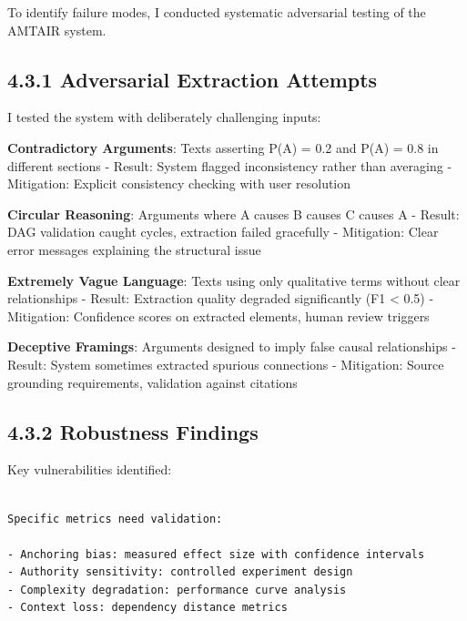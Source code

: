 \documentclass[
  11pt,
  letterpaper,
]{book}
\begin{document}

To identify failure modes, I conducted systematic adversarial testing of
the AMTAIR system.

\subsection*{4.3.1 Adversarial Extraction
Attempts}\label{sec-adversarial-extraction}

I tested the system with deliberately challenging inputs:

\textbf{Contradictory Arguments}: Texts asserting P(A) = 0.2 and P(A) =
0.8 in different sections - Result: System flagged inconsistency rather
than averaging - Mitigation: Explicit consistency checking with user
resolution

\textbf{Circular Reasoning}: Arguments where A causes B causes C causes
A - Result: DAG validation caught cycles, extraction failed gracefully -
Mitigation: Clear error messages explaining the structural issue

\textbf{Extremely Vague Language}: Texts using only qualitative terms
without clear relationships - Result: Extraction quality degraded
significantly (F1 \textless{} 0.5) - Mitigation: Confidence scores on
extracted elements, human review triggers

\textbf{Deceptive Framings}: Arguments designed to imply false causal
relationships - Result: System sometimes extracted spurious connections
- Mitigation: Source grounding requirements, validation against
citations

\subsection*{4.3.2 Robustness Findings}\label{sec-robustness-findings}

Key vulnerabilities identified:

\begin{verbatim}

Specific metrics need validation:

- Anchoring bias: measured effect size with confidence intervals
- Authority sensitivity: controlled experiment design
- Complexity degradation: performance curve analysis
- Context loss: dependency distance metrics
\end{verbatim}
\end{document}
